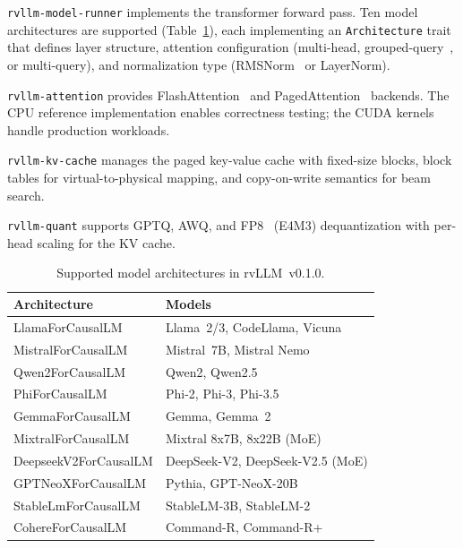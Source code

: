 \documentclass[11pt,a4paper]{article}
\newcommand{\thead}[1]{\textbf{\color{white}#1}}
\begin{document}
\texttt{rvllm-model-runner} implements the transformer forward pass. Ten model
architectures are supported (Table~\ref{tab:architectures}), each implementing an
\texttt{Architecture} trait that defines layer structure, attention configuration
(multi-head, grouped-query~\cite{ainslie2023gqa}, or multi-query), and normalization
type (RMSNorm~\cite{zhang2019root} or LayerNorm).

\texttt{rvllm-attention} provides FlashAttention~\cite{dao2022flashattention,
dao2023flashattention2} and PagedAttention~\cite{kwon2023vllm} backends. The CPU
reference implementation enables correctness testing; the CUDA kernels handle
production workloads.

\texttt{rvllm-kv-cache} manages the paged key-value cache with fixed-size blocks,
block tables for virtual-to-physical mapping, and copy-on-write semantics for beam
search.

\texttt{rvllm-quant} supports GPTQ, AWQ, and FP8~\cite{holkman2023fp8} (E4M3)
dequantization with per-head scaling for the KV cache.

\begin{table}[t]
  \centering
  \caption{Supported model architectures in rvLLM~v0.1.0.}
  \label{tab:architectures}
  \small
  \begin{tabular}{@{}ll@{}}
    \toprule
    \rowcolor{HeaderGray} \thead{Architecture} & \thead{Models} \\
    \midrule
    LlamaForCausalLM      & Llama~2/3, CodeLlama, Vicuna \\
    \rowcolor{gray!8}
    MistralForCausalLM     & Mistral~7B, Mistral Nemo \\
    Qwen2ForCausalLM       & Qwen2, Qwen2.5 \\
    \rowcolor{gray!8}
    PhiForCausalLM         & Phi-2, Phi-3, Phi-3.5 \\
    GemmaForCausalLM       & Gemma, Gemma~2 \\
    \rowcolor{gray!8}
    MixtralForCausalLM     & Mixtral 8x7B, 8x22B (MoE) \\
    DeepseekV2ForCausalLM  & DeepSeek-V2, DeepSeek-V2.5 (MoE) \\
    \rowcolor{gray!8}
    GPTNeoXForCausalLM     & Pythia, GPT-NeoX-20B \\
    StableLmForCausalLM    & StableLM-3B, StableLM-2 \\
    \rowcolor{gray!8}
    CohereForCausalLM      & Command-R, Command-R+ \\
    \bottomrule
  \end{tabular}
\end{table}
\end{document}
